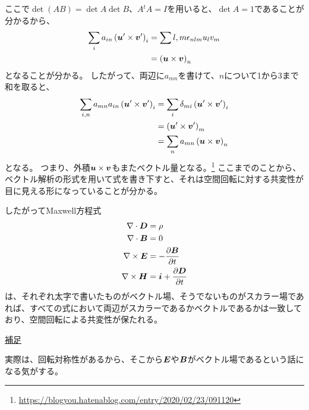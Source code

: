 \documentclass[a4paper]{jsarticle}
\def\vec#1{\mbox{\boldmath $#1$}}
\newcommand{\pdif}[2]{\frac{\partial #1}{\partial #2}}
\begin{document}
ここで$\det(AB) = \det A \det B$、$A{}^t\!A=I$を用いると、$\det A=1$であることが分かるから、
\begin{align}
	\sum_i a_{in} \left( \vec{u}^{\prime} \times \vec{v}^{\prime} \right)_i
	&= \sum{l,m} \epsilon_{nlm} u_l v_m \\
	&= \left( \vec{u} \times \vec{v} \right)_n
\end{align}
となることが分かる。
したがって、両辺に$a_{mn}$を書けて、$n$について1から3まで和を取ると、
\begin{align}
	\sum_{i,n} a_{mn} a_{in} \left( \vec{u}^{\prime} \times \vec{v}^{\prime} \right)_i
	&= \sum_i \delta_{mi} \left( \vec{u}^{\prime} \times \vec{v}^{\prime} \right)_i \\
	&= \left( \vec{u}^{\prime} \times \vec{v}^{\prime} \right)_m \\
	&= \sum_{n} a_{mn} \left( \vec{u} \times \vec{v} \right)_n
\end{align}
となる。
つまり、外積$\vec{u} \times \vec{v}$もまたベクトル量となる。\footnote{\url{https://blogyou.hatenablog.com/entry/2020/02/23/091120}}
ここまでのことから、ベクトル解析の形式を用いて式を書き下すと、それは空間回転に対する共変性が目に見える形になっていることが分かる。

したがってMaxwell方程式
\begin{align}
	\nabla \cdot \vec{D} &= \rho \\
	\nabla \cdot \vec{B} &= 0 \\
	\nabla \times \vec{E} &= -\pdif{\vec{B}}{t} \\
	\nabla \times \vec{H} &= \vec{i} + \pdif{\vec{D}}{t}
\end{align}
は、それぞれ太字で書いたものがベクトル場、そうでないものがスカラー場であれば、すべての式において両辺がスカラーであるかベクトルであるかは一致しており、空間回転による共変性が保たれる。
\begin{screen}
	\underline{補足}

	実際は、回転対称性があるから、そこから$\vec{E}$や$\vec{B}$がベクトル場であるという話になる気がする。
\end{screen}
\end{document}
